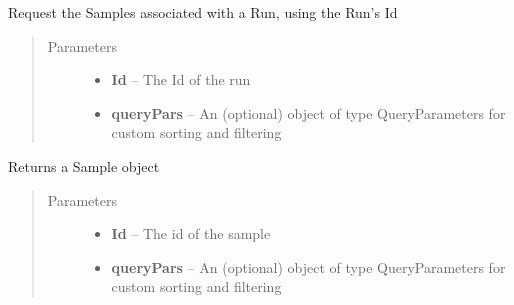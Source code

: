 \documentclass[letterpaper,10pt,english]{sphinxmanual}
\begin{document}
\begin{fulllineitems}
\begin{fulllineitems}
\end{fulllineitems}


\begin{fulllineitems}
\label{Available modules:BaseSpacePy.api.BaseSpaceAPI.BaseSpaceAPI.getRunSamplesById}
Request the Samples associated with a Run, using the Run's Id
\begin{quote}\begin{description}
\item[{Parameters}] \leavevmode\begin{itemize}
\item {} 
\textbf{Id} -- The Id of the run

\item {} 
\textbf{queryPars} -- An (optional) object of type QueryParameters for custom sorting and filtering

\end{itemize}

\end{description}\end{quote}

\end{fulllineitems}


\begin{fulllineitems}
\label{Available modules:BaseSpacePy.api.BaseSpaceAPI.BaseSpaceAPI.getSampleById}
Returns a Sample object
\begin{quote}\begin{description}
\item[{Parameters}] \leavevmode\begin{itemize}
\item {} 
\textbf{Id} -- The id of the sample

\item {} 
\textbf{queryPars} -- An (optional) object of type QueryParameters for custom sorting and filtering

\end{itemize}

\end{description}\end{quote}


\end{fulllineitems}
\end{fulllineitems}
\end{document}
